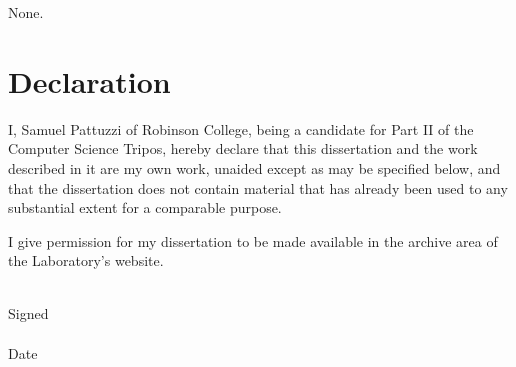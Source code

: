 None.

\newpage
\section*{Declaration}

I, Samuel Pattuzzi of Robinson College, being a candidate for Part II of the
Computer Science Tripos, hereby declare that this dissertation and the work
described in it are my own work, unaided except as may be specified below, and
that the dissertation does not contain material that has already been used to
any substantial extent for a comparable purpose.

I give permission for my dissertation to be made available in the archive
area of the Laboratory's website.

\begin{tabbing}
\bigskip \\
Signed   \= \\
\medskip \\
Date \> \thedate \\
\end{tabbing}

\cleardoublepage
{
 \hypersetup{linkcolor=black}
\setcounter{tocdepth}{2}
\tableofcontents
}
\cleardoublepage
